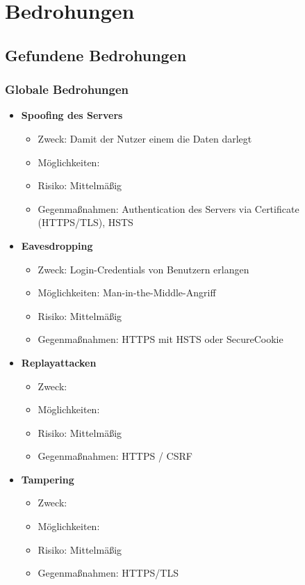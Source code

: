 \documentclass[12pt,DIV14,BCOR10mm,a4paper,parskip=half-,headsepline,headinclude,english,ngerman,bibliography=totocnumbered]{scrreprt}
\begin{document}
\chapter{Bedrohungen}
\section{Gefundene Bedrohungen}

\subsection{Globale Bedrohungen}

\begin{itemize}
  \item \textbf{Spoofing des Servers}
  \begin{itemize}
  \item Zweck: Damit der Nutzer einem die Daten darlegt
  \item Möglichkeiten:
  \item Risiko: Mittelmäßig
  \item Gegenmaßnahmen: Authentication des Servers via Certificate (HTTPS/TLS), HSTS
  \end{itemize}

  \item \textbf{Eavesdropping}
  \begin{itemize}
  \item Zweck: Login-Credentials von Benutzern erlangen
  \item Möglichkeiten: Man-in-the-Middle-Angriff
  \item Risiko: Mittelmäßig
  \item Gegenmaßnahmen: HTTPS mit HSTS oder SecureCookie
  \end{itemize}

  \item \textbf{Replayattacken}
  \begin{itemize}
  \item Zweck:
  \item Möglichkeiten:
  \item Risiko: Mittelmäßig
  \item Gegenmaßnahmen: HTTPS / CSRF
  \end{itemize}

  \item \textbf{Tampering}
  \begin{itemize}
  \item Zweck:
  \item Möglichkeiten:
  \item Risiko: Mittelmäßig
  \item Gegenmaßnahmen: HTTPS/TLS
  \end{itemize}


\end{itemize}
\end{document}
